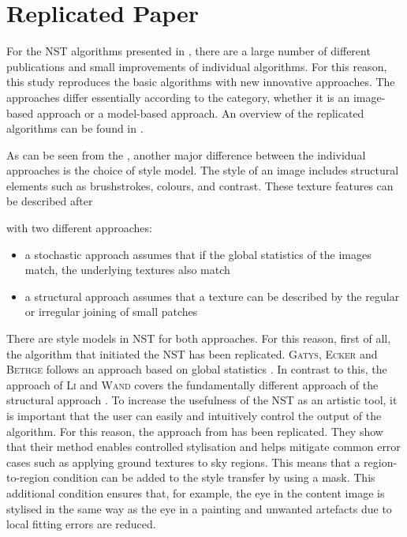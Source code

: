 \section{Replicated Paper} \label{sec:replicated_paper}
For the \gls{NST} algorithms presented in , there are a large number of different publications and small improvements of individual algorithms. For this reason, this study reproduces the basic algorithms with new innovative approaches. The approaches differ essentially according to the category, whether it is an image-based approach or a model-based approach. An overview of the replicated algorithms can be found in . 

As can be seen from the , another major difference between the individual approaches is the choice of style model. The style of an image includes structural elements such as brushstrokes, colours, and contrast. These texture features can be described after \author{Zhou} \cite{Zho2006} with two different approaches:
\begin{itemize}
	\item a stochastic approach assumes that if the global statistics of the images match, the underlying textures also match
	\item a structural approach assumes that a texture can be described by the regular or irregular joining of small patches
\end{itemize}

There are style models in \gls{NST} for both approaches. For this reason, first of all, the algorithm that initiated the \gls{NST} has been replicated. \textsc{Gatys}, \textsc{Ecker} and \textsc{Bethge} follows an approach based on global statistics \cite{GEB2016}. In contrast to this, the approach of \textsc{Li} and \textsc{Wand} covers the fundamentally different approach of the structural approach \cite{LW2016}. To increase the usefulness of the \gls{NST} as an artistic tool, it is important that the user can easily and intuitively control the output of the algorithm. For this reason, the approach from  \cite{GEB+2017} has been replicated. They show that their method enables controlled stylisation and helps mitigate common error cases such as applying ground textures to sky regions. This means that a region-to-region condition can be added to the style transfer by using a mask. This additional condition ensures that, for example, the eye in the content image is stylised in the same way as the eye in a painting and unwanted artefacts due to local fitting errors are reduced.

